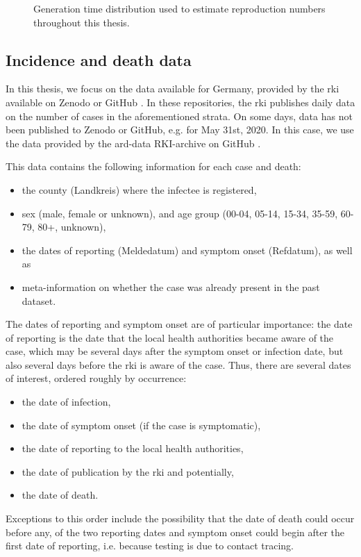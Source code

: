 \begin{figure}
    \resizebox{\textwidth}{!}{%
    }
    \caption{Generation time distribution used to estimate reproduction numbers throughout this thesis.}
    \label{fig:generation_time}
\end{figure}

\subsection{Incidence and death data}
\label{subsec:incidence_and_death_data}
In this thesis, we focus on the data available for Germany, provided by the \acrshort{rki} available on Zenodo \citep{RobertKoch-Institut2024SARSCoV2} or GitHub \citep{RobertKoch-Institut2024SARSCoV2a}. In these repositories, the \acrshort{rki} publishes daily data on the number of cases in the aforementioned strata. On some days, data has not been published to Zenodo or GitHub, e.g. for May 31st, 2020. In this case, we use the data provided by the ard-data RKI-archive on GitHub \citep{MichaelKreil2022RKICoronaDatenArchiv}. 

This data contains the following information for each case and death:
\begin{itemize}
    \item the county (Landkreis) where the infectee is registered,
    \item sex (male, female or unknown), and age group (00-04, 05-14, 15-34, 35-59, 60-79, 80+, unknown),
    \item the dates of reporting (Meldedatum) and symptom onset (Refdatum), as well as
    \item meta-information on whether the case was already present in the past dataset.
\end{itemize}

The dates of reporting and symptom onset are of particular importance: the date of reporting is the date that the local health authorities became aware of the case, which may be several days after the symptom onset or infection date, but also several days before the \acrshort{rki} is aware of the case. Thus, there are several dates of interest, ordered roughly by occurrence: 
\begin{itemize}
    \item the date of infection, 
    \item the date of symptom onset (if the case is symptomatic), 
    \item the date of reporting to the local health authorities,
    \item the date of publication by the \acrshort{rki} and potentially,
    \item the date of death.
\end{itemize}
Exceptions to this order include the possibility that the date of death could occur before any, of the two reporting dates and symptom onset could begin after the first date of reporting, i.e. because testing is due to contact tracing.

